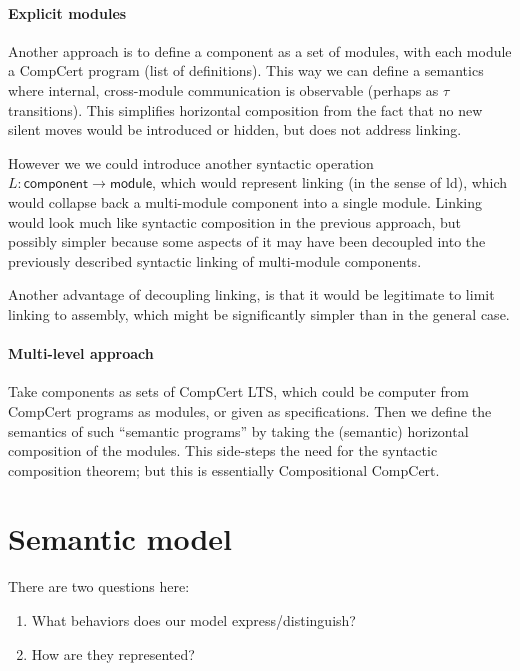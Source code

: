 \documentclass[11pt]{article}
\begin{document}

\paragraph{Explicit modules} %

Another approach is to define a component as a set of modules,
with each module a CompCert program (list of definitions).
This way we can define a semantics where
internal, cross-module communication is observable
(perhaps as $\tau$ transitions).
This simplifies horizontal composition
from the fact that no new silent moves
would be introduced or hidden,
but does not address linking.

However we we could introduce another syntactic operation
$L : \mathsf{component} \rightarrow \mathsf{module}$,
which would represent linking (in the sense of \textsf{ld}),
which would collapse back a multi-module component
into a single module.
Linking would look much like syntactic composition in the previous approach,
but possibly simpler because some aspects of it may have been decoupled
into the previously described
syntactic linking of multi-module components.

Another advantage of decoupling linking,
is that it would be legitimate
to limit linking to assembly,
which might be significantly simpler
than in the general case.


\paragraph{Multi-level approach} %

Take components as sets of CompCert LTS,
which could be computer from CompCert programs as modules,
or given as specifications.
Then we define the semantics of such
``semantic programs'' by taking the (semantic)
horizontal composition of the modules.
This side-steps the need for the syntactic composition theorem;
but this is essentially Compositional CompCert.



\section{Semantic model} %

There are two questions here:
\begin{enumerate}
\item What behaviors does our model express/distinguish?
\item How are they represented?
\end{enumerate}
\end{document}

